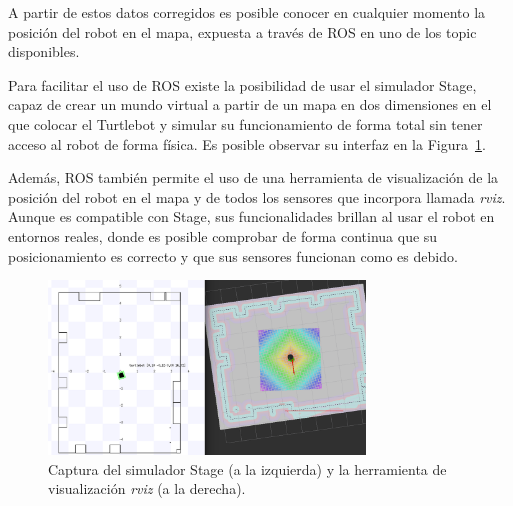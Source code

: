 A partir de estos datos corregidos es posible conocer en cualquier momento la posición del robot en el mapa, expuesta a través de ROS en uno de los topic disponibles.

Para facilitar el uso de ROS existe la posibilidad de usar el simulador Stage, capaz de crear un mundo virtual a partir de un mapa en dos dimensiones en el que colocar el Turtlebot y simular su funcionamiento de forma total sin tener acceso al robot de forma física.
Es posible observar su interfaz en la Figura~\ref{fig:stage_rviz}.

Además, ROS también permite el uso de una herramienta de visualización de la posición del robot en el mapa y de todos los sensores que incorpora llamada \textit{rviz}.
Aunque es compatible con Stage, sus funcionalidades brillan al usar el robot en entornos reales, donde es posible comprobar de forma continua que su posicionamiento es correcto y que sus sensores funcionan como es debido.

\begin{figure}[H] 
    \centering
    \includegraphics[width=0.75\textwidth]{pic/Stage-rviz.png}
    \caption{Captura del simulador Stage (a la izquierda) y la herramienta de visualización \textit{rviz} (a la derecha).}
    \label{fig:stage_rviz}
\end{figure}
